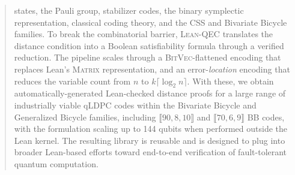 \begin{abstract}
states, the Pauli group, stabilizer codes, the binary symplectic representation,
classical coding theory, and the CSS and Bivariate Bicycle families. To break the combinatorial barrier, \textsc{Lean-QEC} translates the distance
condition into a Boolean satisfiability formula through a verified reduction. The pipeline scales through a \textsc{BitVec}-flattened
encoding that replaces Lean's \textsc{Matrix} representation, and an
error-\emph{location} encoding that reduces the variable count from $n$ to
$k\lceil \log_2 n\rceil$. With these, we obtain automatically-generated Lean-checked distance proofs for a large range of industrially viable qLDPC codes within the Bivariate Bicycle and Generalized Bicycle families, including $\llbracket 90, 8, 10 \rrbracket$ and $\llbracket 70, 6, 9 \rrbracket$ BB codes, with the formulation scaling up to 144 qubits when performed outside the Lean kernel. The resulting library is reusable and is designed to
plug into broader Lean-based efforts toward end-to-end verification of
fault-tolerant quantum computation.
\end{abstract}
